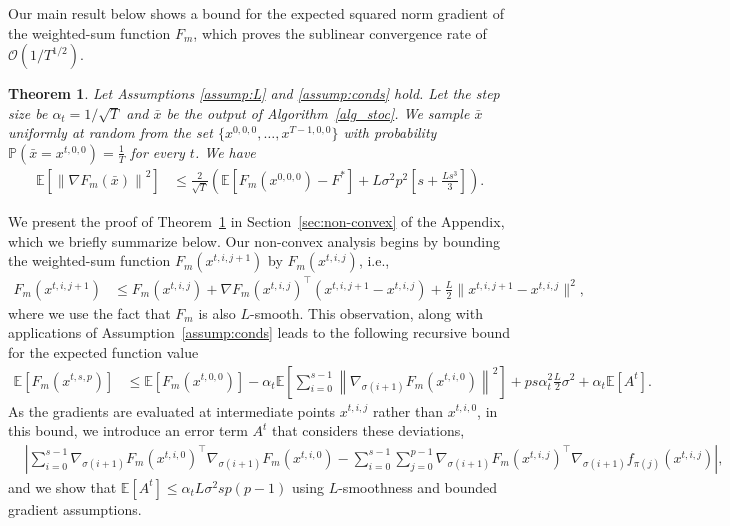 \documentclass[11pt,a4paper]{article}
\numberwithin{equation}{section}%
\newtheorem{theorem}{Theorem}[section]
\renewcommand{\(}{\left (}
\renewcommand{\)}{\right )}
\newcommand{\Lphif}{L}
\newcommand{\Fm}{F_m}
\begin{document}
Our main result below shows a bound for the expected squared norm gradient of the weighted-sum function $F_m$, which proves the sublinear convergence rate of $\mathcal{O}(1/T^{1/2})$. 
\begin{theorem}
\label{thm:non-convex}
Let Assumptions \ref{assump:L} and \ref{assump:conds} hold.
Let the step size be $\alpha_t = {1}/{\sqrt{T}}$ and $\bar{x}$ be the output of Algorithm~\ref{alg_stoc}. We  sample $\bar{x}$ uniformly at random from the set $\{x^{0,0,0}, \dots ,x^{T-1,0,0}\}$  with probability $\mathbb{P} (\bar{x} = x^{t,0,0}) = \frac{1}{T}$ for every $t$. %
We have
\begin{align*}
\mathbb{E} \left[\left\| \nabla \Fm(\bar{x})  \right\|^2 \right] 
&\leq  \frac{2}{\sqrt{T}} \left(\mathbb{E} [\Fm(x^{0,0,0})- F^*]  + \Lphif \sigma^2 p^2\left[s + \frac{\Lphif s^3}{3}\right]\right).
\end{align*}

\end{theorem}
We present the proof of Theorem~\ref{thm:non-convex} in Section~\ref{sec:non-convex} of the Appendix, which we briefly summarize below. Our non-convex analysis 
begins by bounding the weighted-sum function $\Fm(x^{t,i,j+1})$ by $\Fm(x^{t,i,j})$, i.e., 
\begin{align*}
\Fm(x^{t,i,j+1}) &\leq \Fm(x^{t,i,j}) + \nabla \Fm(x^{t,i,j})^\top (x^{t,i,j+1} - x^{t,i,j}) + \frac{\Lphif}{2} \|x^{t,i,j+1} - x^{t,i,j}\|^2,
\end{align*}
where we use the fact that $\Fm$ is also $\Lphif$-smooth. This observation, along with applications of Assumption~\ref{assump:conds} leads to the following recursive bound for the expected function value 
\begin{align*}%
\mathbb{E} [\Fm(x^{t,s,p})]
&\leq \mathbb{E} [\Fm(x^{t,0,0})] - \alpha_t  \mathbb{E} \left[\sum_{i=0}^{s-1}\left\| \nabla_{\sigma(i+1)} \Fm(x^{t,i,0})  \right\|^2 \right]   + ps\alpha_t^2 \frac{\Lphif}{2} \sigma^2 + \alpha_t \mathbb{E} [A^t]. 
\end{align*}
As the gradients are evaluated at intermediate points $x^{t,i,j}$ rather than $x^{t,i,0}$, in this bound, we introduce an error term $A^t$ that considers these deviations,
\begin{align*}
&\left|\sum_{i=0}^{s-1}\nabla_{\sigma(i+1)} \Fm(x^{t,i,0})^\top \nabla_{\sigma(i+1)} \Fm(x^{t,i,0}) -\sum_{i=0}^{s-1}\sum_{j=0}^{p-1}\nabla_{\sigma(i+1)} \Fm(x^{t,i,j})^\top  \nabla_{\sigma(i+1)} f_{\pi(j)} (x^{t,i,j})\right|,
\end{align*}
and we show that $\mathbb{E}[A^t]  \leq  \alpha_t \Lphif \sigma^2 s p(p-1)$ using 
$\Lphif$-smoothness and bounded gradient assumptions.
\end{document}
